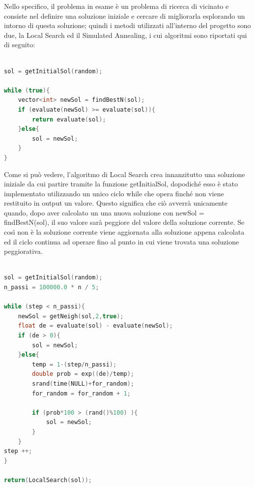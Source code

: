 \documentclass[preprint,12pt]{elsarticle}
\begin{document}
Nello specifico, il problema in esame è un problema di ricerca di vicinato e consiste nel definire una soluzione iniziale e cercare di migliorarla esplorando un intorno di questa soluzione; quindi i metodi utilizzati all'interno del progetto sono due, la Local Search ed il Simulated Annealing, i cui algoritmi sono riportati qui di seguito:


\begin{lstlisting}[basicstyle=\small, caption={Local Search}, frame=single, language=C++]

sol = getInitialSol(random);

while (true){
	vector<int> newSol = findBestN(sol);
	if (evaluate(newSol) >= evaluate(sol)){	
		return evaluate(sol);
	}else{					
		sol = newSol;
	}
}


\end{lstlisting}


Come si può vedere, l'algoritmo di Local Search crea innanzitutto una soluzione iniziale da cui partire tramite la funzione getInitialSol, dopodiché esso è stato implementato utilizzando un unico ciclo while che opera finché non viene restituito in output un valore. Questo significa che ciò avverrà unicamente quando, dopo aver calcolato un una nuova soluzione con newSol = findBestN(sol), il suo valore sarà peggiore del valore della soluzione corrente. Se così non è la soluzione corrente viene aggiornata alla soluzione appena calcolata ed il ciclo continua ad operare fino al punto in cui viene trovata una soluzione peggiorativa. 


\begin{lstlisting}[basicstyle=\small, caption={Simulated Annealing}, frame=single, language=C++]

sol = getInitialSol(random);
n_passi = 100000.0 * n / 5;

while (step < n_passi){
	newSol = getNeigh(sol,2,true);			
	float de = evaluate(sol) - evaluate(newSol);
	if (de > 0){
		sol = newSol;
	}else{ 
		temp = 1-(step/n_passi);	
		double prob = exp((de)/temp);	
		srand(time(NULL)+for_random);		
		for_random = for_random + 1;
		
		if (prob*100 > (rand()%100) ){
			sol = newSol;
		}
	}
step ++; 
}

return(LocalSearch(sol));
	
\end{lstlisting}
\end{document}
